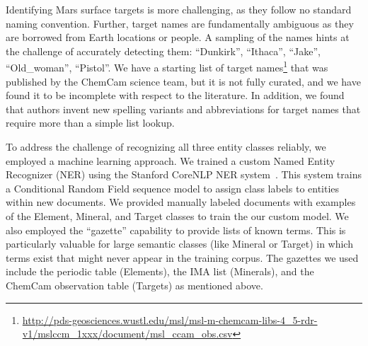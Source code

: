 \documentclass[letterpaper]{article} %
\begin{document}
Identifying Mars surface targets is more challenging, as they follow
no standard naming convention.  Further, target names are
fundamentally ambiguous as they are borrowed from Earth locations or
people.  A sampling of the names hints at the challenge of accurately
detecting them: ``Dunkirk'', ``Ithaca'', ``Jake'', ``Old\_woman'',
``Pistol''.  We have a starting list of target
names\footnote{\url{http://pds-geosciences.wustl.edu/msl/msl-m-chemcam-libs-4_5-rdr-v1/mslccm_1xxx/document/msl_ccam_obs.csv}}
that was published by the ChemCam science team, but it is not fully
curated, and we have found it to be incomplete with respect to the
literature.
%
In addition, we found that authors invent new spelling
variants and abbreviations for target names that require more than a
simple list lookup.

To address the challenge of recognizing all three entity classes
reliably, we employed a machine learning approach.  We trained a
custom Named Entity Recognizer (NER) using the Stanford CoreNLP NER
system~\cite{finkel:ner05}.  This system trains a Conditional Random
Field sequence model to assign class labels to entities within new
documents.  We provided manually labeled documents with examples of
the Element, Mineral, and Target classes to train the our custom
model.  We also employed the ``gazette'' capability to provide lists
of known terms.  This is particularly valuable for large semantic
classes (like Mineral or Target) in which terms exist that might never
appear in the training corpus.  The gazettes we used include the
periodic table (Elements), the IMA list (Minerals), and the ChemCam
observation table (Targets) as mentioned above.




\end{document}
